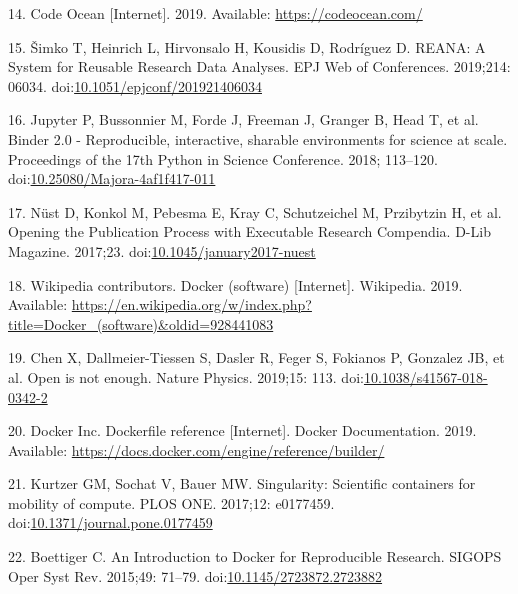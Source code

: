 \documentclass[10pt,letterpaper]{article}
\begin{document}
\leavevmode\hypertarget{ref-code_ocean_2019}{}%
14. Code Ocean {[}Internet{]}. 2019. Available:
\url{https://codeocean.com/}

\leavevmode\hypertarget{ref-simko_reana_2019}{}%
15. Šimko T, Heinrich L, Hirvonsalo H, Kousidis D, Rodríguez D. REANA: A
System for Reusable Research Data Analyses. EPJ Web of Conferences.
2019;214: 06034.
doi:\href{https://doi.org/10.1051/epjconf/201921406034}{10.1051/epjconf/201921406034}

\leavevmode\hypertarget{ref-jupyter_binder_2018}{}%
16. Jupyter P, Bussonnier M, Forde J, Freeman J, Granger B, Head T, et
al. Binder 2.0 - Reproducible, interactive, sharable environments for
science at scale. Proceedings of the 17th Python in Science Conference.
2018; 113--120.
doi:\href{https://doi.org/10.25080/Majora-4af1f417-011}{10.25080/Majora-4af1f417-011}

\leavevmode\hypertarget{ref-nust_opening_2017}{}%
17. Nüst D, Konkol M, Pebesma E, Kray C, Schutzeichel M, Przibytzin H,
et al. Opening the Publication Process with Executable Research
Compendia. D-Lib Magazine. 2017;23.
doi:\href{https://doi.org/10.1045/january2017-nuest}{10.1045/january2017-nuest}

\leavevmode\hypertarget{ref-wikipedia_contributors_docker_2019}{}%
18. Wikipedia contributors. Docker (software) {[}Internet{]}. Wikipedia.
2019. Available:
\url{https://en.wikipedia.org/w/index.php?title=Docker_(software)\&oldid=928441083}

\leavevmode\hypertarget{ref-chen_open_2019}{}%
19. Chen X, Dallmeier-Tiessen S, Dasler R, Feger S, Fokianos P, Gonzalez
JB, et al. Open is not enough. Nature Physics. 2019;15: 113.
doi:\href{https://doi.org/10.1038/s41567-018-0342-2}{10.1038/s41567-018-0342-2}

\leavevmode\hypertarget{ref-docker_inc_dockerfile_2019}{}%
20. Docker Inc. Dockerfile reference {[}Internet{]}. Docker
Documentation. 2019. Available:
\url{https://docs.docker.com/engine/reference/builder/}

\leavevmode\hypertarget{ref-kurtzer_singularity_2017}{}%
21. Kurtzer GM, Sochat V, Bauer MW. Singularity: Scientific containers
for mobility of compute. PLOS ONE. 2017;12: e0177459.
doi:\href{https://doi.org/10.1371/journal.pone.0177459}{10.1371/journal.pone.0177459}

\leavevmode\hypertarget{ref-boettiger_introduction_2015}{}%
22. Boettiger C. An Introduction to Docker for Reproducible Research.
SIGOPS Oper Syst Rev. 2015;49: 71--79.
doi:\href{https://doi.org/10.1145/2723872.2723882}{10.1145/2723872.2723882}
\end{document}
